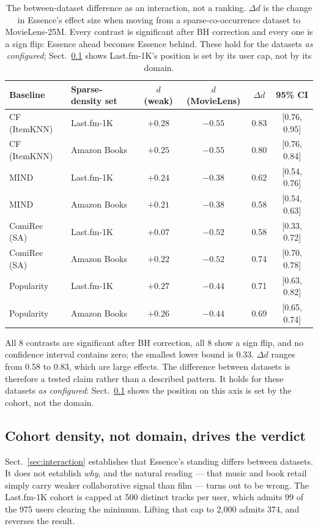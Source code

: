 \documentclass[runningheads]{llncs}
\begin{document}
\begin{table}[tb]
\caption{The between-dataset difference as an interaction, not a ranking. $\Delta d$ is the
change in Essence's effect size when moving from a sparse-co-occurrence dataset to
MovieLens-25M. Every contrast is significant after BH correction and every one is a sign
flip: Essence ahead becomes Essence behind. These hold for the datasets \emph{as
configured}; Sect.~\ref{sec:cohort} shows Last.fm-1K's position is set by its user cap, not
by its domain.}\label{tab:interaction}
\centering
\footnotesize
\begin{tabular}{@{}llcccc@{}}
\toprule
Baseline & Sparse-density set & $d$ (weak) & $d$ (MovieLens) & $\Delta d$ & 95\% CI \\
\midrule
CF (ItemKNN) & Last.fm-1K & $+0.28$ & $-0.55$ & 0.83 & [0.76, 0.95] \\
CF (ItemKNN) & Amazon Books & $+0.25$ & $-0.55$ & 0.80 & [0.76, 0.84] \\
MIND & Last.fm-1K & $+0.24$ & $-0.38$ & 0.62 & [0.54, 0.76] \\
MIND & Amazon Books & $+0.21$ & $-0.38$ & 0.58 & [0.54, 0.63] \\
ComiRec (SA) & Last.fm-1K & $+0.07$ & $-0.52$ & 0.58 & [0.33, 0.72] \\
ComiRec (SA) & Amazon Books & $+0.22$ & $-0.52$ & 0.74 & [0.70, 0.78] \\
Popularity & Last.fm-1K & $+0.27$ & $-0.44$ & 0.71 & [0.63, 0.82] \\
Popularity & Amazon Books & $+0.26$ & $-0.44$ & 0.69 & [0.65, 0.74] \\
\bottomrule
\end{tabular}
\end{table}

All 8 contrasts are significant after BH correction, all 8 show a sign flip, and no
confidence interval contains zero; the smallest lower bound is 0.33. $\Delta d$ ranges
from 0.58 to 0.83, which are large effects. The difference between datasets is therefore a tested claim rather than a described
pattern. It holds for these datasets \emph{as configured}: Sect.~\ref{sec:cohort} shows
the position on this axis is set by the cohort, not the domain.

\subsection{Cohort density, not domain, drives the verdict}\label{sec:cohort}

Sect.~\ref{sec:interaction} establishes that Essence's standing differs between datasets.
It does not establish \emph{why}, and the natural reading --- that music and book retail
simply carry weaker collaborative signal than film --- turns out to be wrong. The Last.fm-1K
cohort is capped at 500 distinct tracks per user, which admits 99 of the 975 users clearing
the minimum. Lifting that cap to 2{,}000 admits 374, and reverses the result.
\end{document}

